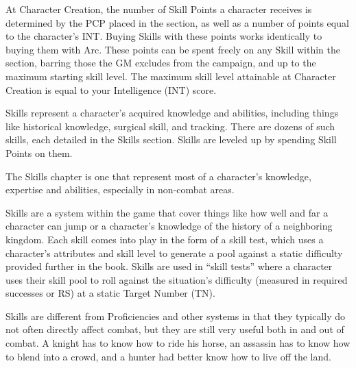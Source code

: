 \documentclass[oneside,11pt,english]{book}
\begin{document}
At Character Creation, the number of Skill Points a character receives is determined by the PCP placed in 
the section, as well as a number of points equal to the character’s INT. Buying Skills with these points 
works identically to buying them with Arc. These points can be spent freely on any Skill within the 
section, barring those the GM excludes from the campaign, and up to the maximum starting skill level. 
The maximum skill level attainable at Character Creation is equal to your Intelligence (INT) score. 


Skills represent a character's acquired knowledge and abilities, including things like historical knowledge, 
surgical skill, and tracking. There are dozens of such skills, each detailed in the Skills section. Skills are leveled up by spending Skill Points on them. 


The Skills chapter is one that represent most of a character’s knowledge, expertise and abilities, especially in non-combat areas.


Skills are a system within the game that cover things like how well and far a character can jump or a character’s knowledge of the history of a neighboring kingdom. Each skill comes into play in the form of a skill test, which uses a character’s attributes and skill level to generate a pool against a static difficulty provided further in the book. Skills are used in “skill tests” where a character uses their skill pool to roll against the situation’s difficulty (measured in required successes or RS) at a static Target Number (TN).


Skills are different from Proficiencies and other systems in that they typically do not often directly affect combat, but they are still very useful both in and out of combat. A knight has to know how to ride his horse, an assassin has to know how to blend into a crowd, and a hunter had better know how to live off the land.
\end{document}
